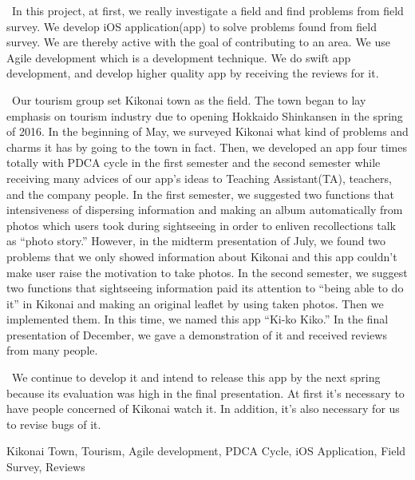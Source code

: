 \begin{eabstract} 

\ In this project, at first, we really investigate a field and find problems from field survey. We develop iOS application(app) to solve problems found from field survey. We are thereby active with the goal of contributing to an area. We use Agile development which is a development technique. We do swift app development, and develop higher quality app by receiving the reviews for it. 

\ Our tourism group set Kikonai town as the field. The town began to lay emphasis on tourism industry due to opening Hokkaido Shinkansen in the spring of 2016. In the beginning of May, we surveyed Kikonai what kind of problems and charms it has by going to the town in fact. Then, we developed an app four times totally with PDCA cycle in the first semester and the second semester while receiving many advices of our app's ideas to Teaching Assistant(TA), teachers, and the company people. In the first semester, we suggested two functions that intensiveness of dispersing information and making an album automatically from photos which users took during sightseeing in order to enliven recollections talk as “photo story.” However, in the midterm presentation of July, we found two problems that we only showed information about Kikonai and this app couldn't make user raise the motivation to take photos. In the second semester, we suggest two functions that sightseeing information paid its attention to “being able to do it” in Kikonai and making an original leaflet by using taken photos. Then we implemented them. In this time, we named this app “Ki-ko Kiko.” In the final presentation of December, we gave a demonstration of it and received reviews from many people.

\ We continue to develop it and intend to release this app by the next spring because its evaluation was high in the final presentation. At first it's necessary to have people concerned of Kikonai watch it. In addition, it's also necessary for us to revise bugs of it.



\begin{ekeyword}
Kikonai Town, Tourism, Agile development, PDCA Cycle, iOS Application, Field Survey, Reviews
\end{ekeyword}
\end{eabstract}